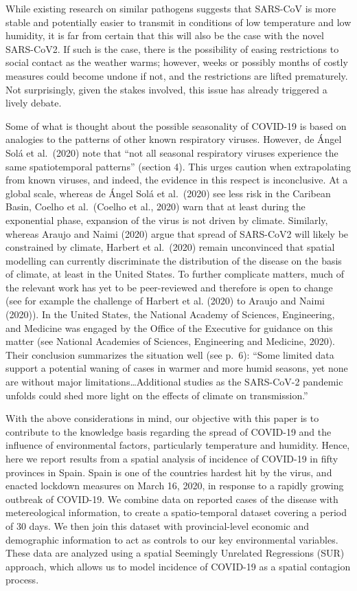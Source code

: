 \documentclass[]{elsarticle} %
\begin{document}
While existing research on similar pathogens suggests that SARS-CoV is
more stable and potentially easier to transmit in conditions of low
temperature and low humidity, it is far from certain that this will also
be the case with the novel SARS-CoV2. If such is the case, there is the
possibility of easing restrictions to social contact as the weather
warms; however, weeks or possibly months of costly measures could become
undone if not, and the restrictions are lifted prematurely. Not
surprisingly, given the stakes involved, this issue has already
triggered a lively debate.

Some of what is thought about the possible seasonality of COVID-19 is
based on analogies to the patterns of other known respiratory viruses.
However, de Ángel Solá et al.~(2020) note that ``not all seasonal
respiratory viruses experience the same spatiotemporal patterns''
(section 4). This urges caution when extrapolating from known viruses,
and indeed, the evidence in this respect is inconclusive. At a global
scale, whereas de Ángel Solá et al.~(2020) see less risk in the Caribean
Basin, Coelho et al.~(Coelho et al., 2020) warn that at least during the
exponential phase, expansion of the virus is not driven by climate.
Similarly, whereas Araujo and Naimi (2020) argue that spread of
SARS-CoV2 will likely be constrained by climate, Harbert et al.~(2020)
remain unconvinced that spatial modelling can currently discriminate the
distribution of the disease on the basis of climate, at least in the
United States. To further complicate matters, much of the relevant work
has yet to be peer-reviewed and therefore is open to change (see for
example the challenge of Harbert et al. (2020) to Araujo and Naimi
(2020)). In the United States, the National Academy of Sciences,
Engineering, and Medicine was engaged by the Office of the Executive for
guidance on this matter (see National Academies of Sciences, Engineering
and Medicine, 2020). Their conclusion summarizes the situation well (see
p.~6): ``Some limited data support a potential waning of cases in warmer
and more humid seasons, yet none are without major
limitations\ldots{}Additional studies as the SARS-CoV-2 pandemic unfolds
could shed more light on the effects of climate on transmission.''

With the above considerations in mind, our objective with this paper is
to contribute to the knowledge basis regarding the spread of COVID-19
and the influence of environmental factors, particularly temperature and
humidity. Hence, here we report results from a spatial analysis of
incidence of COVID-19 in fifty provinces in Spain. Spain is one of the
countries hardest hit by the virus, and enacted lockdown measures on
March 16, 2020, in response to a rapidly growing outbreak of COVID-19.
We combine data on reported cases of the disease with metereological
information, to create a spatio-temporal dataset covering a period of 30
days. We then join this dataset with provincial-level economic and
demographic information to act as controls to our key environmental
variables. These data are analyzed using a spatial Seemingly Unrelated
Regressions (SUR) approach, which allows us to model incidence of
COVID-19 as a spatial contagion process.
\end{document}
